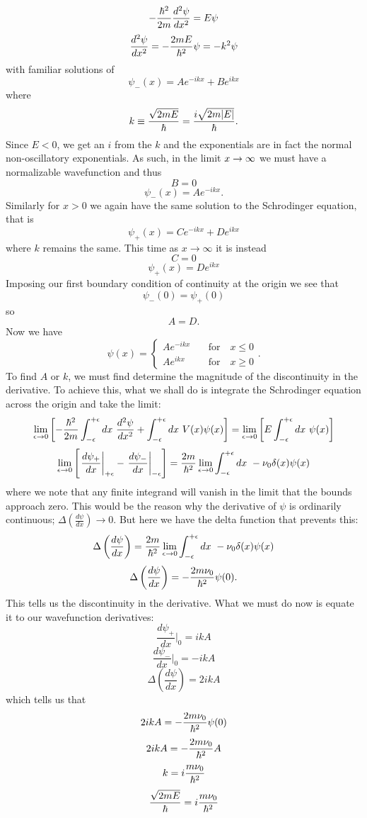 \documentclass[11pt,letterpaper]{article}
\begin{document}
\begin{enumerate}
$$-\frac{\hbar^2}{2m}\frac{d^2\psi}{dx^2} = E\psi$$
$$\frac{d^2\psi}{dx^2} = -\frac{2mE}{\hbar^2}\psi = -k^2\psi$$
with familiar solutions of
$$\psi_-(x) = Ae^{-ikx}+Be^{ikx}$$
where $$k\equiv\frac{\sqrt{2mE}}{\hbar}=\frac{i\sqrt{2m|E|}}{\hbar}.$$
Since $E<0$, we get an $i$ from the $k$ and the exponentials are in fact the normal non-oscillatory exponentials. As such, in the limit $x\to\-\infty$ we must have a normalizable wavefunction and thus
$$B= 0$$
$$\psi_-(x) = Ae^{-ikx}.$$
Similarly for $x>0$ we again have the same solution to the Schrodinger equation, that is
$$\psi_+(x) = Ce^{-ikx}+De^{ikx}$$
where $k$ remains the same. This time as $x\to\infty$ it is instead 
$$C=0$$
$$\psi_+(x) = De^{ikx}$$
Imposing our first boundary condition of continuity at the origin we see that 
$$\psi_-(0) = \psi_+(0)$$
so
$$A=D.$$
Now we have
$$\psi(x) = \begin{cases}Ae^{-ikx}&\quad\text{for}\quad x\le 0\\Ae^{ikx}&\quad\text{for}\quad x\ge 0\end{cases}.$$
To find $A$ or $k$, we must find determine the magnitude of the discontinuity in the derivative. To achieve this, what we shall do is integrate the Schrodinger equation across the origin and take the limit:
$$\lim_{\epsilon\to 0}\left[ -\frac{\h^2}{2m}\int_{-\epsilon}^{+\epsilon}{dx\ \frac{d^2\psi}{dx^2}}+\int_{-\epsilon}^{+\epsilon}{dx\ V(x)\psi(x)}\right] = \lim_{\epsilon\to 0}\left[E\int_{-\epsilon}^{+\epsilon}{dx\ \psi(x)}\right] 
$$
$$\lim_{\epsilon\to 0}\left[\left.\frac{d\psi_+}{dx}\right|_{+\epsilon}-\left.\frac{d\psi_-}{dx}\right|_{-\epsilon}\right] = \frac{2m}{\h^2}\lim_{\epsilon\to 0}\int_{-\epsilon}^{+\epsilon}{dx\ -\nu_0\delta(x)\psi(x)}
$$
where we note that any finite integrand will vanish in the limit that the bounds approach zero. This would be the reason why the derivative of $\psi$ is ordinarily continuous; $\Delta\left(\frac{d\psi}{dx}\right) \to 0$. But here we have the delta function that prevents this:
$$\Delta\left(\frac{d\psi}{dx}\right)= \frac{2m}{\h^2}\lim_{\epsilon\to 0}\int_{-\epsilon}^{+\epsilon}{dx\ -\nu_0\delta(x)\psi(x)}
$$
$$\Delta\left(\frac{d\psi}{dx}\right)= -\frac{2m\nu_0}{\hbar^2}\psi(0).$$
This tells us the discontinuity in the derivative. What we must do now is equate it to our wavefunction derivatives:
$$\left.\frac{d\psi_+}{dx}\right.|_0 = ikA$$
$$\left.\frac{d\psi_-}{dx}\right.|_0 = -ikA$$
$$\Delta\left(\frac{d\psi}{dx}\right) = 2ikA $$
which tells us that
$$2ikA= -\frac{2m\nu_0}{\hbar^2}\psi(0)$$
$$2ikA= -\frac{2m\nu_0}{\hbar^2}A$$
$$k = i\frac{m\nu_0}{\hbar^2}$$
$$\frac{\sqrt{2mE}}{\hbar}=i\frac{m\nu_0}{\hbar^2}$$

\end{enumerate}
\end{document}
